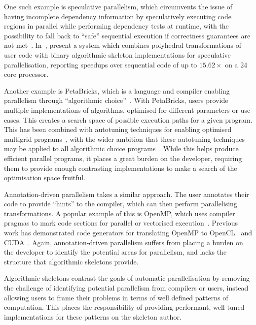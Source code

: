 One such example is speculative parallelism, which circumvents the
issue of having incomplete dependency information by speculatively
executing code regions in parallel while performing dependency tests
at runtime, with the possibility to fall back to ``safe'' sequential
execution if correctness guarantees are not
met~\cite{Prabhu2010,Trachsel2010}. In~\cite{Jimborean2014},
\citeauthor{Jimborean2014} present a system which combines polyhedral
transformations of user code with binary algorithmic skeleton
implementations for speculative parallelisation, reporting speedups
over sequential code of up to $15.62\times$ on a 24 core processor.

Another example is PetaBricks, which is a language and compiler
enabling parallelism through ``algorithmic choice''~\cite{Ansel2009,
Ansel2010}. With PetaBricks, users provide multiple implementations
of algorithms, optimised for different parameters or use cases. This
creates a search space of possible execution paths for a given
program. This has been combined with autotuning techniques for
enabling optimised multigrid programs~\cite{Chan2009}, with the wider
ambition that these autotuning techniques may be applied to all
algorithmic choice programs~\cite{Ansel2014}. While this helps produce
efficient parallel programs, it places a great burden on the
developer, requiring them to provide enough contrasting
implementations to make a search of the optimisation space fruitful.

Annotation-driven parallelism takes a similar approach. The user
annotates their code to provide ``hints'' to the compiler, which can
then perform parallelising transformations. A popular example of this
is OpenMP, which uses compiler pragmas to mark code sections for
parallel or vectorised execution~\cite{Dagum1998}. Previous work has
demonstrated code generators for translating OpenMP to
OpenCL~\cite{Grewe2013} and CUDA~\cite{Lee2009}. Again,
annotation-driven parallelism suffers from placing a burden on the
developer to identify the potential areas for parallelism, and lacks
the structure that algorithmic skeletons provide.

Algorithmic skeletons contrast the goals of automatic parallelisation
by removing the challenge of identifying potential parallelism from
compilers or users, instead allowing users to frame their problems in
terms of well defined patterns of computation. This places the
responsibility of providing performant, well tuned implementations for
these patterns on the skeleton author.


